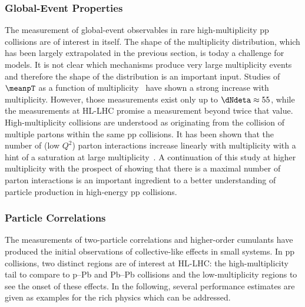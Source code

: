 \documentclass[../report.tex]{subfiles}
\begin{document}
\subsubsection{Global-Event Properties}

The measurement of global-event observables in rare high-multiplicity pp collisions are of interest in itself. The shape of the multiplicity distribution, which has been largely extrapolated in the previous section, is today a challenge for models. It is not clear which mechanisms produce very large multiplicity events and therefore the shape of the distribution is an important input. Studies of $\meanpT$ as a function of multiplicity~\cite{Abelev:2013bla} have shown a strong increase with multiplicity. However, those measurements exist only up to $\dNdeta \approx 55$, while the measurements at HL-LHC promise a measurement beyond twice that value. High-multiplicity collisions are understood as originating from the collision of multiple partons within the same pp collisions. It has been shown that the number of (low $Q^2$) parton interactions increase linearly with multiplicity with a hint of a saturation at large multiplicity~\cite{Abelev:2013sqa}. A continuation of this study at higher multiplicity with the prospect of showing that there is a maximal number of parton interactions is an important ingredient to a better understanding of particle production in high-energy pp collisions.

\subsubsection{Particle Correlations}

The measurements of two-particle correlations and higher-order cumulants have produced the initial observations of collective-like effects in small systems. In pp collisions, two distinct regions are of interest at HL-LHC: the high-multiplicity tail to compare to p--Pb and Pb--Pb collisions and the low-multiplicity regions to see the onset of these effects. In the following, several performance estimates are given as examples for the rich physics which can be addressed. 
\end{document}

